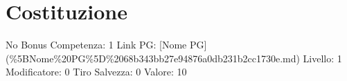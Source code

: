 \section{Costituzione}\label{costituzione}

\begin{description}
\tightlist
\item[Tags: STAT]
No Bonus Competenza: 1 Link PG: {[}Nome PG{]}
(\%5BNome\%20PG\%5D\%2068b343bb27e94876a0db231b2cc1730e.md) Livello: 1
Modificatore: 0 Tiro Salvezza: 0 Valore: 10
\end{description}
